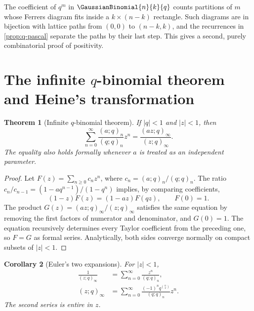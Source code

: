 \documentclass[11pt]{article}
\theoremstyle{blueplain}
\newtheorem{theorem}{Theorem}[section]
\newtheorem{corollary}[theorem]{Corollary}
\theoremstyle{bluedef}
\begin{document}
The coefficient of $q^m$ in $\GaussianBinomial{n}{k}{q}$ counts partitions of $m$ whose Ferrers diagram fits inside a $k\times(n-k)$ rectangle. Such diagrams are in bijection with lattice paths from $(0,0)$ to $(n-k,k)$, and the recurrences in \cref{prop:q-pascal} separate the paths by their last step. This gives a second, purely combinatorial proof of positivity.

\section{The infinite $q$-binomial theorem and Heine's transformation}

\begin{theorem}[Infinite $q$-binomial theorem]\label{thm:infinite-qbinomial}
If $|q|<1$ and $|z|<1$, then
\begin{equation}\label{eq:infinite-qbinomial}
\sum_{n=0}^{\infty}\frac{(a;q)_n}{(q;q)_n}z^n
=\frac{(az;q)_\infty}{(z;q)_\infty}.
\end{equation}
The equality also holds formally whenever $a$ is treated as an independent parameter.
\end{theorem}

\begin{proof}
Let $F(z)=\sum_{n\ge0}c_nz^n$, where $c_n=(a;q)_n/(q;q)_n$. The ratio $c_n/c_{n-1}=(1-aq^{n-1})/(1-q^n)$ implies, by comparing coefficients,
\begin{equation}\label{eq:qdiff-F}
(1-z)F(z)=(1-az)F(qz),\qquad F(0)=1.
\end{equation}
The product $G(z)=(az;q)_\infty/(z;q)_\infty$ satisfies the same equation by removing the first factors of numerator and denominator, and $G(0)=1$. The equation recursively determines every Taylor coefficient from the preceding one, so $F=G$ as formal series. Analytically, both sides converge normally on compact subsets of $|z|<1$.
\end{proof}

\begin{corollary}[Euler's two expansions]\label{cor:euler-expansions}
For $|z|<1$,
\begin{align}
\frac1{(z;q)_\infty}&=\sum_{n=0}^{\infty}\frac{z^n}{(q;q)_n}, \label{eq:euler-first}\\
(z;q)_\infty&=\sum_{n=0}^{\infty}\frac{(-1)^nq^{\binom n2}}{(q;q)_n}z^n. \label{eq:euler-second}
\end{align}
The second series is entire in $z$.
\end{corollary}
\end{document}
